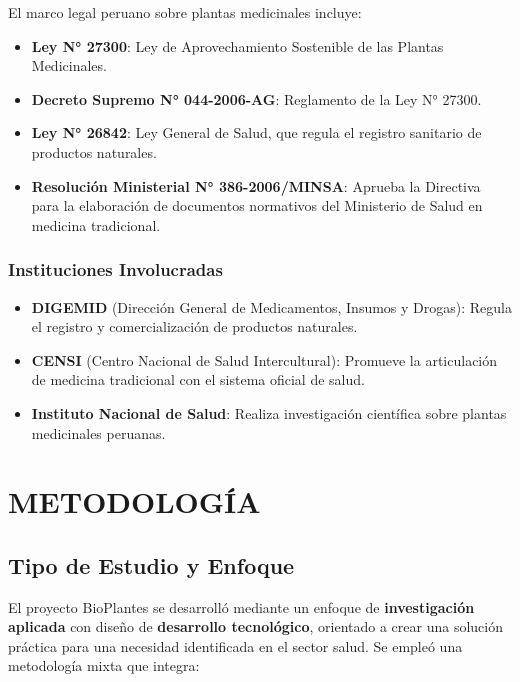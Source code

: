 \documentclass[12pt,a4paper]{article}
\begin{document}
El marco legal peruano sobre plantas medicinales incluye:

\begin{itemize}
    \item \textbf{Ley N° 27300}: Ley de Aprovechamiento Sostenible de las Plantas Medicinales.
    \item \textbf{Decreto Supremo N° 044-2006-AG}: Reglamento de la Ley N° 27300.
    \item \textbf{Ley N° 26842}: Ley General de Salud, que regula el registro sanitario de productos naturales.
    \item \textbf{Resolución Ministerial N° 386-2006/MINSA}: Aprueba la Directiva para la elaboración de documentos normativos del Ministerio de Salud en medicina tradicional.
\end{itemize}

\subsubsection{Instituciones Involucradas}

\begin{itemize}
    \item \textbf{DIGEMID} (Dirección General de Medicamentos, Insumos y Drogas): Regula el registro y comercialización de productos naturales.
    \item \textbf{CENSI} (Centro Nacional de Salud Intercultural): Promueve la articulación de medicina tradicional con el sistema oficial de salud.
    \item \textbf{Instituto Nacional de Salud}: Realiza investigación científica sobre plantas medicinales peruanas.
\end{itemize}


\section{METODOLOGÍA}

\subsection{Tipo de Estudio y Enfoque}

El proyecto BioPlantes se desarrolló mediante un enfoque de \textbf{investigación aplicada} con diseño de \textbf{desarrollo tecnológico}, orientado a crear una solución práctica para una necesidad identificada en el sector salud. Se empleó una metodología mixta que integra:
\end{document}
